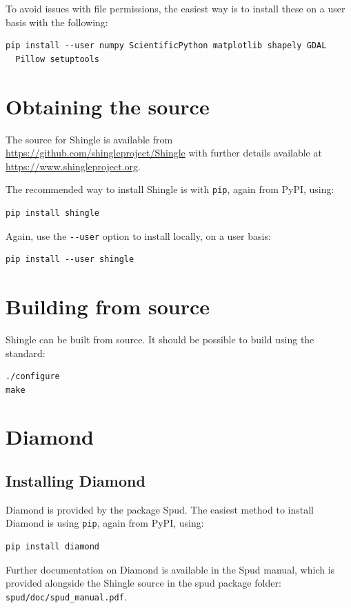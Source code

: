 \documentclass[a4paper, 10pt]{book}
\providecommand{\shingle}{Shingle\xspace}
\begin{document}
\noindent
To avoid issues with file permissions, the easiest way is to install these on a user basis with the following:
\begin{verbatim}
pip install --user numpy ScientificPython matplotlib shapely GDAL
  Pillow setuptools
\end{verbatim}

\section{Obtaining the source}

\noindent
The source for \shingle is available from
\url{https://github.com/shingleproject/Shingle}
with further details available at
\url{https://www.shingleproject.org}.

\noindent
The recommended way to install \shingle is with \verb+pip+, again from PyPI, using:
\begin{verbatim}
pip install shingle 
\end{verbatim}

\noindent
Again, use the \verb+--user+ option to install locally, on a user basis:
\begin{verbatim}
pip install --user shingle 
\end{verbatim}

\section{Building from source}

\shingle can be built from source.  It should be possible to build using the standard:
\begin{verbatim}
./configure
make
\end{verbatim}

\section{Diamond}

\subsection{Installing Diamond}

\noindent
Diamond is provided by the package Spud.
The easiest method to install Diamond is using \verb+pip+, again from PyPI, using:
\begin{verbatim}
pip install diamond 
\end{verbatim}
Further documentation on Diamond is available in the Spud manual,
which is provided alongside the \shingle source in the spud package folder: \verb+spud/doc/spud_manual.pdf+.
\end{document}
